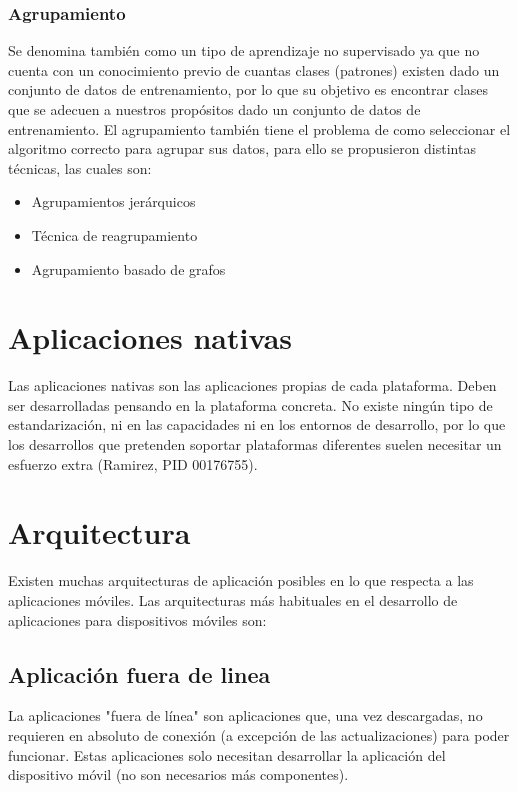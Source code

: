 \subsubsection{Agrupamiento}
Se denomina también como un tipo de aprendizaje no supervisado ya que no cuenta con un conocimiento previo de cuantas clases (patrones) existen dado un conjunto de datos de entrenamiento, por lo que su objetivo es encontrar clases que se adecuen a nuestros propósitos dado un conjunto de datos de entrenamiento. 
El agrupamiento también tiene el problema de como seleccionar el algoritmo correcto para agrupar sus datos, para ello se propusieron distintas técnicas, las cuales son:
\begin{itemize}
	\item Agrupamientos jerárquicos
	\item Técnica de reagrupamiento
	\item Agrupamiento basado de grafos
\end{itemize}

\section{Aplicaciones nativas}

Las aplicaciones nativas son las aplicaciones propias de cada plataforma. Deben ser desarrolladas pensando en la plataforma concreta. No existe ningún tipo de estandarización, ni en las capacidades ni en los entornos de desarrollo, por lo que los desarrollos que pretenden soportar plataformas diferentes suelen necesitar un esfuerzo extra (Ramirez,  PID 00176755).

\section{Arquitectura}
Existen muchas arquitecturas de aplicación posibles en lo que respecta a las aplicaciones móviles.  Las arquitecturas más habituales en el desarrollo de aplicaciones para dispositivos móviles son:

\subsection{Aplicación fuera de linea}
La aplicaciones "fuera de línea" son aplicaciones que, una vez descargadas, no requieren en absoluto de conexión (a excepción de las actualizaciones) para poder funcionar. Estas aplicaciones solo necesitan desarrollar la aplicación del dispositivo móvil (no son necesarios más componentes).

